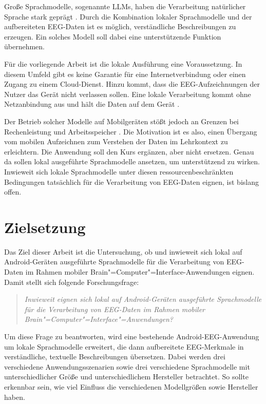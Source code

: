\noindent Große Sprachmodelle, sogenannte \acp{LLM}, haben die Verarbeitung natürlicher Sprache stark geprägt \autocite{edgellm_review}. Durch die Kombination lokaler Sprachmodelle und der aufbereiteten \ac{EEG}-Daten ist es möglich, verständliche Beschreibungen zu erzeugen. Ein solches Modell soll dabei eine unterstützende Funktion übernehmen.
\vspace{\baselineskip}

\noindent Für die vorliegende Arbeit ist die lokale Ausführung eine Voraussetzung. In diesem Umfeld gibt es keine Garantie für eine Internetverbindung oder einen Zugang zu einem Cloud-Dienst. Hinzu kommt, dass die \ac{EEG}-Aufzeichnungen der Nutzer das Gerät nicht verlassen sollen. Eine lokale Verarbeitung kommt ohne Netzanbindung aus und hält die Daten auf dem Gerät \autocite{edgellm_review}.
\vspace{\baselineskip}

\noindent Der Betrieb solcher Modelle auf Mobilgeräten stößt jedoch an Grenzen bei Rechenleistung und Arbeitsspeicher \autocite{edgellm_review}.
Die Motivation ist es also, einen Übergang vom mobilen Aufzeichnen zum Verstehen der Daten im Lehrkontext zu erleichtern. Die Anwendung soll den Kurs ergänzen, aber nicht ersetzen. Genau da sollen lokal ausgeführte Sprachmodelle ansetzen, um unterstützend zu wirken.
Inwieweit sich lokale Sprachmodelle unter diesen ressourcenbeschränkten Bedingungen tatsächlich für die Verarbeitung von \ac{EEG}-Daten eignen, ist bislang offen.

\section{Zielsetzung}
\label{sec:zielsetzung}
Das Ziel dieser Arbeit ist die Untersuchung, ob und inwieweit sich lokal auf Android-Geräten ausgeführte Sprachmodelle für die Verarbeitung von \ac{EEG}-Daten im Rahmen mobiler Brain"=Computer"=Interface-Anwendungen eignen. Damit stellt sich folgende Forschungsfrage:

\begin{quote}
\itshape Inwieweit eignen sich lokal auf Android-Geräten ausgeführte Sprachmodelle für die Verarbeitung von \ac{EEG}-Daten im Rahmen mobiler Brain"=Computer"=Interface"=Anwendungen?
\end{quote}

\noindent Um diese Frage zu beantworten, wird eine bestehende Android-\ac{EEG}-Anwendung um lokale Sprachmodelle erweitert, die dann aufbereitete \ac{EEG}-Merkmale in verständliche, textuelle Beschreibungen übersetzen. Dabei werden drei verschiedene Anwendungsszenarien sowie drei verschiedene Sprachmodelle mit unterschiedlicher Größe und unterschiedlichem Hersteller betrachtet. So sollte erkennbar sein, wie viel Einfluss die verschiedenen Modellgrößen sowie Hersteller haben.
\vspace{\baselineskip}

